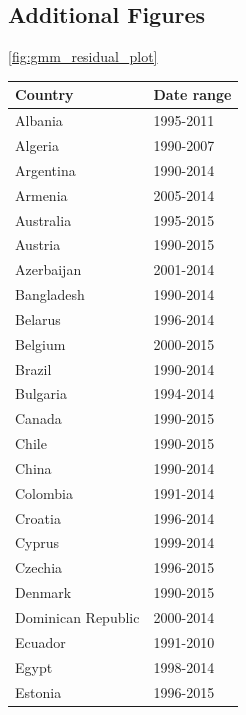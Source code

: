 \documentclass[12pt,a4paper]{article}
\begin{document}
\subsection{Additional Figures}\label{sec:graph_appendix}

\cref{fig:gmm_residual_plot}

\renewcommand{\arraystretch}{1}
\begin{table}[htbp]
\centering
\begin{subtable}{0.45\textwidth}
\centering
\begin{tabular}{ll}
\toprule
   Country & Date range \\
\midrule
                   Albania &  1995-2011 \\
                   Algeria &  1990-2007 \\
                 Argentina &  1990-2014 \\
                   Armenia &  2005-2014 \\
                 Australia &  1995-2015 \\
                   Austria &  1990-2015 \\
                Azerbaijan &  2001-2014 \\
                Bangladesh &  1990-2014 \\
                   Belarus &  1996-2014 \\
                   Belgium &  2000-2015 \\
                    Brazil &  1990-2014 \\
                  Bulgaria &  1994-2014 \\
                    Canada &  1990-2015 \\
                     Chile &  1990-2015 \\
                     China &  1990-2014 \\
                  Colombia &  1991-2014 \\
                   Croatia &  1996-2014 \\
                    Cyprus &  1999-2014 \\
                   Czechia &  1996-2015 \\
                   Denmark &  1990-2015 \\
        Dominican Republic &  2000-2014 \\
                   Ecuador &  1991-2010 \\
                     Egypt &  1998-2014 \\
                   Estonia &  1996-2015 \\

\end{tabular}
\end{subtable}
\end{table}
\end{document}
